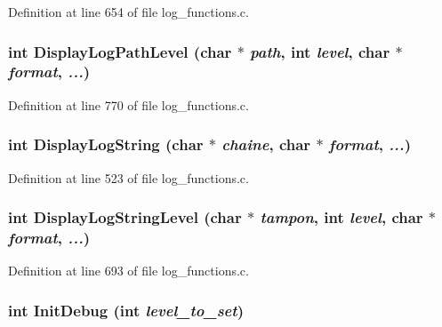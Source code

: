 Definition at line 654 of file log\_\-functions.c.
\subsubsection[{DisplayLogPathLevel}]{\setlength{\rightskip}{0pt plus 5cm}int DisplayLogPathLevel (char $\ast$ {\em path}, \/  int {\em level}, \/  char $\ast$ {\em format}, \/   {\em ...})}\label{log__functions_8c_e6bdd1b5ea324bd829b574a33753a1e7}




Definition at line 770 of file log\_\-functions.c.
\subsubsection[{DisplayLogString}]{\setlength{\rightskip}{0pt plus 5cm}int DisplayLogString (char $\ast$ {\em chaine}, \/  char $\ast$ {\em format}, \/   {\em ...})}\label{log__functions_8c_329d936e1ce562f134e90455a76ba62e}




Definition at line 523 of file log\_\-functions.c.
\subsubsection[{DisplayLogStringLevel}]{\setlength{\rightskip}{0pt plus 5cm}int DisplayLogStringLevel (char $\ast$ {\em tampon}, \/  int {\em level}, \/  char $\ast$ {\em format}, \/   {\em ...})}\label{log__functions_8c_49875294e20783252beff8942342e1a7}




Definition at line 693 of file log\_\-functions.c.
\subsubsection[{InitDebug}]{\setlength{\rightskip}{0pt plus 5cm}int InitDebug (int {\em level\_\-to\_\-set})}\label{log__functions_8c_52c6a8893f855b3db6f70c605ed2acaa}




